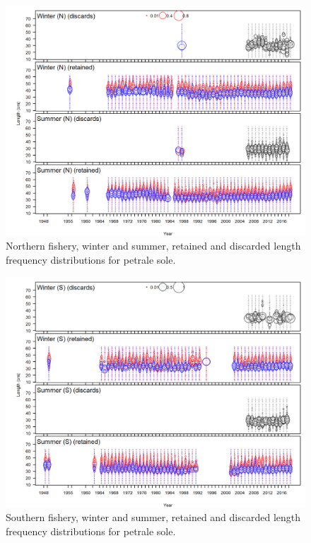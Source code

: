 \documentclass[12pt,]{article}
\begin{document}
\FloatBarrier

\begin{figure}
\centering
\includegraphics{r4ss/plots_mod1/comp_lendat__page1_multi-fleet_comparison.png}
\caption{Northern fishery, winter and summer, retained and discarded
length frequency distributions for petrale sole.
\label{fig:north_lengths}}
\end{figure}

\FloatBarrier

\begin{figure}
\centering
\includegraphics{r4ss/plots_mod1/comp_lendat__page2_multi-fleet_comparison.png}
\caption{Southern fishery, winter and summer, retained and discarded
length frequency distributions for petrale sole.
\label{fig:south_lengths}}
\end{figure}
\end{document}
